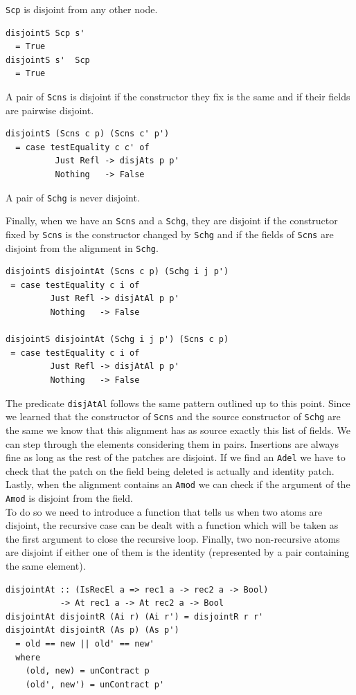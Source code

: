 \documentclass[11pt, titlepage]{article}
\newcommand{\toHaskell}[1]{\texttt{#1}\xspace}
\newcommand{\scp}{\toHaskell{Scp}}
\newcommand{\scns}{\toHaskell{Scns}}
\newcommand{\schg}{\toHaskell{Schg}}
\newcommand{\adel}{\toHaskell{Adel}}
\newcommand{\amod}{\toHaskell{Amod}}
\begin{document}
\scp is disjoint from any other node. 

\begin{verbatim}
disjointS Scp s'
  = True
disjointS s'  Scp
  = True
\end{verbatim}

A pair of \scns is disjoint if the constructor they fix is the same and if their 
fields are pairwise disjoint.

\begin{verbatim}
disjointS (Scns c p) (Scns c' p')
  = case testEquality c c' of
          Just Refl -> disjAts p p'
          Nothing   -> False
\end{verbatim}                   

A pair of \schg is never disjoint.


Finally, when we have an \scns and a \schg, they are disjoint if the constructor 
fixed by \scns is the constructor changed by \schg and if the fields of \scns 
are disjoint from the alignment in \schg. 

\begin{verbatim}
disjointS disjointAt (Scns c p) (Schg i j p')
 = case testEquality c i of
         Just Refl -> disjAtAl p p'
         Nothing   -> False

disjointS disjointAt (Schg i j p') (Scns c p)
 = case testEquality c i of
         Just Refl -> disjAtAl p p'
         Nothing   -> False
\end{verbatim}

The predicate \toHaskell{disjAtAl} follows the same pattern outlined up to this point.
Since we learned that the constructor of \scns and the source constructor of \schg are the same we know that this alignment has as source exactly this list 
of fields. We can step through the elements considering them in pairs. 
Insertions are always fine as long as the rest of the patches are disjoint.
If we find an \adel we have to check that the patch on the field being deleted is actually and identity patch. 
Lastly, when the alignment contains an \amod we can check if the argument of the \amod is disjoint from the field.
\\
To do so we need to introduce a function that tells us when two atoms are disjoint, the recursive case can be dealt with a function which will be taken as the first argument to close the recursive loop.
Finally, two non-recursive atoms are disjoint if either one of them is the identity (represented by a pair containing the same element).

\begin{verbatim}
disjointAt :: (IsRecEl a => rec1 a -> rec2 a -> Bool)
           -> At rec1 a -> At rec2 a -> Bool
disjointAt disjointR (Ai r) (Ai r') = disjointR r r'
disjointAt disjointR (As p) (As p')
  = old == new || old' == new'
  where
    (old, new) = unContract p
    (old', new') = unContract p'
\end{verbatim}
\end{document}
